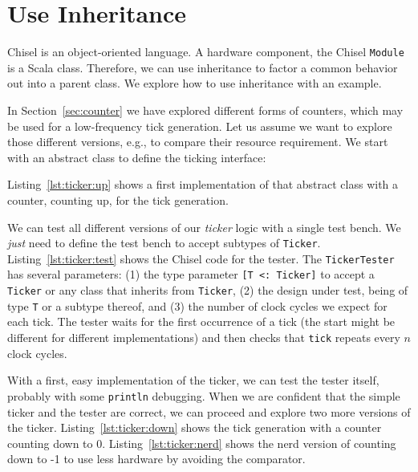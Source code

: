 \documentclass[%
    10pt,
    headinclude, footexclude,
    openright, %
    notitlepage,
    cleardoubleempty,
    headsepline,
    pointlessnumbers,
    bibtotoc, idxtotoc,
    ]{scrbook}
\newcommand{\code}[1]{{\small{\texttt{#1}}}}
\begin{document}
\section{Use Inheritance}
\label{sec:inheritance}

Chisel is an object-oriented language. A hardware component, the Chisel \code{Module}
is a Scala class. Therefore, we can use inheritance to factor a common behavior
out into a parent class. We explore how to use inheritance with an example.

In Section~\ref{sec:counter} we have explored different forms of counters,
which may be used for a low-frequency tick generation. Let us assume we want to
explore those different versions, e.g., to compare their resource requirement.
We start with an abstract class to define the ticking interface:


\noindent Listing~\ref{lst:ticker:up} shows a first implementation of that abstract class
with a counter, counting up, for the tick generation.


We can test all different versions of our \emph{ticker} logic with a single test bench.
We \emph{just} need to define the test bench to accept subtypes of \code{Ticker}.
Listing~\ref{lst:ticker:test} shows the Chisel code for the tester.
The \code{TickerTester} has several parameters: (1) the type parameter
\code{[T <: Ticker]} to accept a \code{Ticker} or any class that inherits from \code{Ticker},
(2) the design under test, being of type \code{T} or a subtype thereof,
and (3) the number of clock cycles we expect for each tick.
The tester waits for the first occurrence of a tick (the start might be different for
different implementations) and then checks that \code{tick} repeats every $n$ clock cycles.


With a first, easy implementation of the ticker, we can test the tester
itself, probably with some \code{println} debugging. When we are confident that
the simple ticker and the tester are correct, we can proceed and explore
two more versions of the ticker. Listing~\ref{lst:ticker:down} shows the tick
generation with a counter counting down to 0.
Listing~\ref{lst:ticker:nerd} shows the nerd version of counting down to -1 to use
less hardware by avoiding the comparator.
\end{document}

